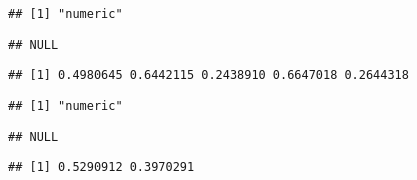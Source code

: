 \documentclass[krantz2]{krantz}\usepackage{knitr}%
\begin{document}
\begin{knitrout}\footnotesize
{}\color{fgcolor}\begin{kframe}
\begin{alltt}
\hlstd{(}\hlstd{)}
 \hlkwb{<-} \hlstd{(}\hlstd{(}\hlstd{),}  \hlstd{=} \hlstd{)}
 \hlkwb{<-} \hlstd{(}   \hlstd{=} \hlstd{,}    \hlstd{=} \hlstd{)}
\end{alltt}
\begin{verbatim}
## [1] "numeric"
\end{verbatim}
\begin{alltt}
\end{alltt}
\begin{verbatim}
## NULL
\end{verbatim}
\begin{alltt}
\end{alltt}
\begin{verbatim}
## [1] 0.4980645 0.6442115 0.2438910 0.6647018 0.2644318
\end{verbatim}
\begin{alltt}
 \hlkwb{<-} \hlstd{(}   \hlstd{=} \hlstd{,}    \hlstd{=} \hlstd{)}
\end{alltt}
\begin{verbatim}
## [1] "numeric"
\end{verbatim}
\begin{alltt}
\end{alltt}
\begin{verbatim}
## NULL
\end{verbatim}
\begin{alltt}
\end{alltt}
\begin{verbatim}
## [1] 0.5290912 0.3970291
\end{verbatim}
\end{kframe}
\end{knitrout}
\end{document}
